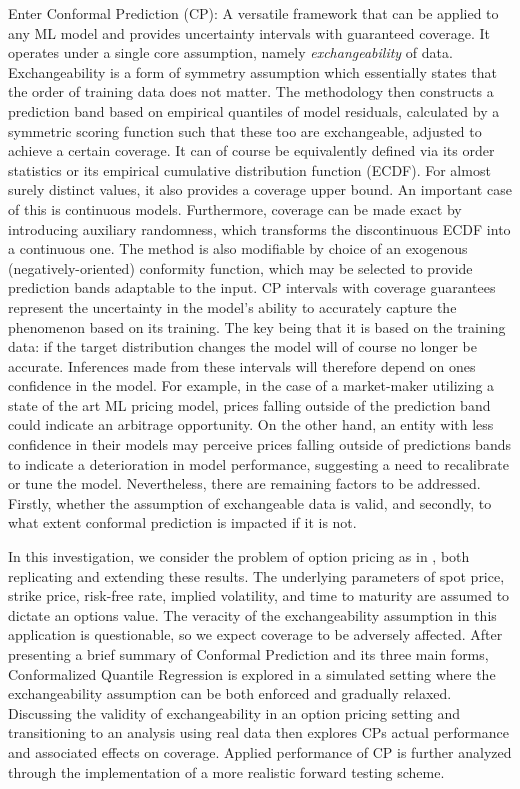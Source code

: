 \documentclass{article}
\theoremstyle{definition}
\begin{document}
Enter Conformal Prediction (CP): A versatile framework that can be applied to any ML model and provides uncertainty intervals with guaranteed coverage. It operates under a single core assumption, namely \textit{exchangeability} of data. Exchangeability is a form of symmetry assumption which essentially states that the order of training data does not matter. The methodology then constructs a prediction band based on empirical quantiles of model residuals, calculated by a symmetric scoring function such that these too are exchangeable, adjusted to achieve a certain coverage. It can of course be equivalently defined via its order statistics or its empirical cumulative distribution function (ECDF). For almost surely distinct values, it also provides a coverage upper bound. An important case of this is continuous models. Furthermore, coverage can be made exact by introducing auxiliary randomness, which transforms the discontinuous ECDF into a continuous one. The method is also modifiable by choice of an exogenous (negatively-oriented) conformity function, which may be selected to provide prediction bands adaptable to the input. CP intervals with coverage guarantees represent the uncertainty in the model's ability to accurately capture the phenomenon based on its training. The key being that it is based on the training data: if the target distribution changes the model will of course no longer be accurate. Inferences made from these intervals will therefore depend on ones confidence in the model. For example, in the case of a market-maker utilizing a state of the art ML pricing model, prices falling outside of the prediction band could indicate an arbitrage opportunity. On the other hand, an entity with less confidence in their models may perceive prices falling outside of predictions bands to indicate a deterioration in model performance, suggesting a need to recalibrate or tune the model. Nevertheless, there are remaining factors to be addressed. Firstly, whether the assumption of exchangeable data is valid, and secondly, to what extent conformal prediction is impacted if it is not. 

In this investigation, we consider the problem of option pricing as in \cite{bastos}, both replicating and extending these results. The underlying parameters of spot price, strike price, risk-free rate, implied volatility, and time to maturity are assumed to dictate an options value. The veracity of the exchangeability assumption in this application is questionable, so we expect coverage to be adversely affected. After presenting a brief summary of Conformal Prediction and its three main forms, Conformalized Quantile Regression is explored in a simulated setting where the exchangeability assumption can be both enforced and gradually relaxed. Discussing the validity of exchangeability in an option pricing setting and transitioning to an analysis using real data then explores CPs actual performance and associated effects on coverage. Applied performance of CP is further analyzed through the implementation of a more realistic forward testing scheme.
\end{document}
